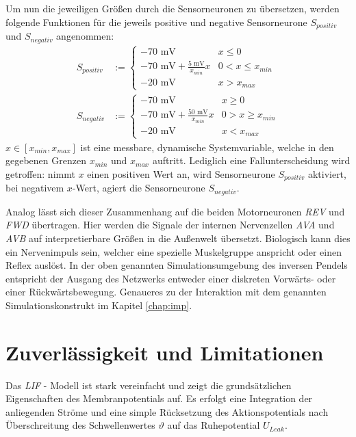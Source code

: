 	Um nun die jeweiligen Größen durch die Sensorneuronen zu übersetzen, werden folgende Funktionen für die jeweils positive und negative Sensorneurone $S_{positiv}$ und $S_{negativ}$ angenommen:
	\begin{align}
		\label{eq:sensor_translation_p}
		S_{positiv} &:= \begin{cases}-70\text{ mV} & x\leq 0\\-70\text{ mV} + \frac{5\text{ mV}}{x_{min}}x & 0 < x \leq x_{min} \\-20\text{ mV} & x > x_{max}  \end{cases}\\
		\label{eq:sensor_translation_n}
		S_{negativ} &:= \begin{cases}-70\text{ mV} & x\geq 0\\-70\text{ mV} + \frac{50\text{ mV}}{x_{min}}x & 0 > x \geq x_{min} \\-20\text{ mV} & x < x_{max}  \end{cases}
	\end{align}
	$x\in[x_{min}, x_{max}]$ ist eine messbare, dynamische Systemvariable, welche in den gegebenen Grenzen $x_{min} $ und $x_{max}$ auftritt. Lediglich eine Fallunterscheidung wird getroffen: nimmt $x$ einen positiven Wert an, wird Sensorneurone $S_{positiv}$ aktiviert, bei negativem $x$-Wert, agiert die Sensorneurone $S_{negativ}$.
	
	Analog lässt sich dieser Zusammenhang auf die beiden Motorneuronen \textit{REV} und \textit{FWD} übertragen. Hier werden die Signale der internen Nervenzellen \textit{AVA} und \textit{AVB} auf interpretierbare Größen in die Außenwelt übersetzt. Biologisch kann dies ein Nervenimpuls sein, welcher eine spezielle Muskelgruppe anspricht oder einen Reflex auslöst. In der oben genannten Simulationsumgebung des inversen Pendels entspricht der Ausgang des Netzwerks entweder einer diskreten Vorwärts- oder einer Rückwärtsbewegung. Genaueres zu der Interaktion mit dem genannten Simulationskonstrukt im Kapitel \ref{chap:imp}.

\section{Zuverlässigkeit und Limitationen}
\label{sec:lif_lim}
	Das \textit{LIF} - Modell ist stark vereinfacht und zeigt die grundsätzlichen Eigenschaften des Membranpotentials auf. Es erfolgt eine Integration der anliegenden Ströme und eine simple Rücksetzung des Aktionspotentials nach Überschreitung des Schwellenwertes $\vartheta$ auf das Ruhepotential $U_{Leak}$.
	
